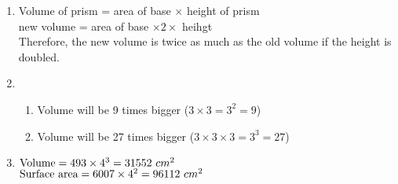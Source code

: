  \begin{solutions}{}{
\begin{enumerate}[itemsep=5pt, label=\textbf{\arabic*}. ] 
\item Volume of prism = area of base $\times$ height of prism \\
new volume = area of base $\times 2 \times$ heihgt \\
Therefore, the new volume is twice as much as the old volume if the height is doubled. 
\item \begin{enumerate}[itemsep=5pt, label=\textbf{\alph*}.]
       \item Volume will be 9 times bigger ($3 \times 3 = 3^{2} = 9$)
\item Volume will be 27 times bigger ($3 \times 3 \times 3 = 3^{3} = 27$)
      \end{enumerate}
\item $\mbox{Volume} = 493 \times 4^{3} \\
= 31552 ~cm^{2}$ \\
$\mbox{Surface area} = 6007 \times 4^{2} \\
= 96112 ~cm^{2}$
\end{enumerate}}
\end{solutions}


